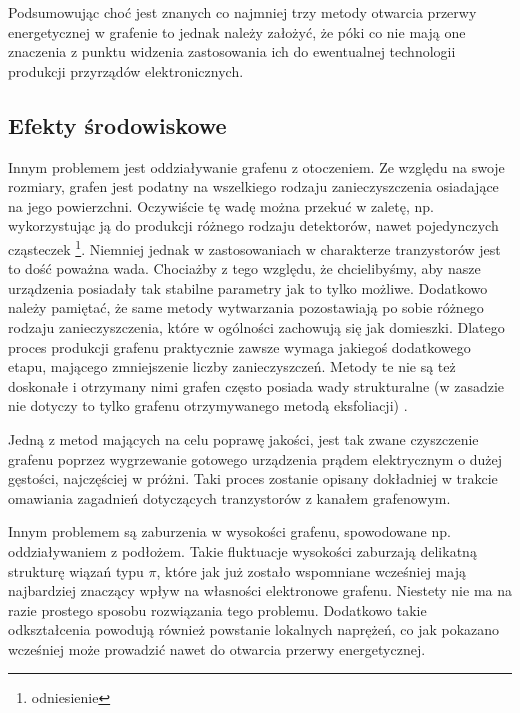 	Podsumowując choć jest znanych co najmniej trzy metody otwarcia przerwy energetycznej w grafenie to jednak
	należy założyć, że póki co nie mają one znaczenia z punktu widzenia zastosowania ich do ewentualnej 
	technologii produkcji przyrządów elektronicznych.
	


	\subsection{Efekty środowiskowe}
	Innym problemem jest oddziaływanie grafenu z otoczeniem. Ze względu na swoje rozmiary, grafen jest podatny
	na wszelkiego rodzaju zanieczyszczenia osiadające na jego powierzchni. Oczywiście tę wadę można przekuć w 
	zaletę, np. wykorzystując ją do produkcji różnego rodzaju detektorów, nawet pojedynczych cząsteczek
	\footnote{odniesienie}. Niemniej jednak w zastosowaniach w charakterze tranzystorów jest to dość poważna wada. 
	Chociażby z tego względu, że chcielibyśmy, aby nasze urządzenia posiadały tak stabilne parametry jak to tylko
	możliwe.
	Dodatkowo należy pamiętać, że same metody wytwarzania pozostawiają po sobie różnego rodzaju zanieczyszczenia, 
	które w ogólności zachowują się jak domieszki. Dlatego proces produkcji grafenu praktycznie zawsze 
	wymaga jakiegoś dodatkowego
	etapu, mającego zmniejszenie liczby zanieczyszczeń. Metody te nie są też doskonałe i otrzymany nimi grafen często
	posiada wady strukturalne (w zasadzie nie dotyczy to tylko grafenu otrzymywanego metodą eksfoliacji) .
	
	Jedną z metod mających na celu poprawę jakości, jest tak zwane czyszczenie grafenu poprzez
	 wygrzewanie gotowego urządzenia prądem elektrycznym
	o dużej gęstości, najczęściej w próżni. Taki proces zostanie opisany dokładniej w trakcie omawiania zagadnień 
	dotyczących tranzystorów z kanałem grafenowym.
	
	Innym problemem są zaburzenia w wysokości grafenu, spowodowane np. oddziaływaniem z podłożem. Takie fluktuacje 
	wysokości zaburzają delikatną strukturę wiązań typu $\pi$, które jak już zostało wspomniane wcześniej mają 
	najbardziej znaczący 
	wpływ na własności elektronowe grafenu. Niestety nie ma na razie prostego sposobu rozwiązania tego problemu.
	Dodatkowo takie odkształcenia powodują również powstanie lokalnych naprężeń, co jak pokazano wcześniej może
	prowadzić nawet do otwarcia przerwy energetycznej.

